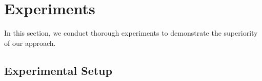 \documentclass[11pt,a4paper]{article}
\begin{document}
\section{Experiments}\label{sec:experiment}

In this section, we conduct thorough experiments to demonstrate the superiority of our approach.

\subsection{Experimental Setup}

\begin{table*}[t]
    \centering
    \caption{The experimental results of (\textbf{Top}) general and (\textbf{Bottom}) BERT-based results on \textsc{Multi}. : Results from \citet{pan-etal-2019-improving}. A bolded \textbf{number} in a column indicates a statistically significant improvement against all the baselines (), whereas underline \underline{numbers} show comparable performances. Both are same for Table~\ref{tab:rewrite_expr_result}\&\ref{tab:task_canard_result}. }
    \label{tab:multi_expr_result}
\end{table*}
\end{document}

